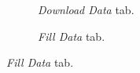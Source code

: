 \documentclass[WHATMANUAL.tex]{subfiles}
\begin{document}
\begin{figure}[!h]
    \centering
    \vspace{2.0cm}
    \begin{subfigure}[t]{0.45\textwidth}
        \setlength{\fboxsep}{0pt}
        \caption{\emph{Download Data} tab.}
        \label{subfig:ScnShot_000}                
    \end{subfigure}%
    \hspace{0.5cm}
    \begin{subfigure}[t]{0.45\textwidth}
        \setlength{\fboxsep}{0pt}
        \caption{\emph{Fill Data} tab.}

\end{subfigure}
\end{figure}
\end{document}
